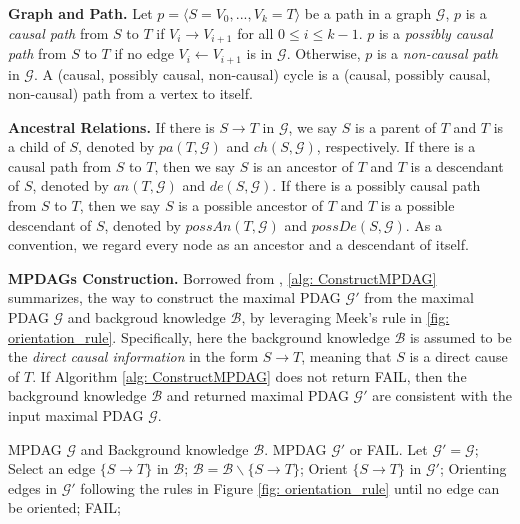 \documentclass{article}
\begin{document}
\textbf{Graph and Path.}
Let $p=\langle S=V_{0},..., V_{k}=T\rangle $ be a path in a graph $\mathcal{G}$, $p$ is a \textit{causal path} from $S$ to $T$ if $V_i \rightarrow V_{i+1}$ for all $0 \leq i \leq k-1 $. $p$ is a \textit{possibly causal path} from $S$ to $T$ if no edge $V_i \leftarrow V_{i+1}$ is in $\mathcal{G}$. Otherwise, $p$ is a \textit{non-causal path} in $\mathcal{G}$. A (causal, possibly causal, non-causal) cycle is a (causal, possibly causal, non-causal) path from a vertex to itself.

\textbf{Ancestral Relations.}
If there is $S \rightarrow T$ in $\mathcal{G}$, we say $S$ is a parent of $T$ and $T$ is a child of $S$, denoted by $pa(T,\mathcal{G})$ and $ch(S,\mathcal{G})$, respectively. If there is a causal path from $S$ to $T$, then we say $S$ is an ancestor of $T$ and $T$ is a descendant of $S$, denoted by $an(T,\mathcal{G})$ and $de(S,\mathcal{G})$. If there is a possibly causal path from $S$ to $T$, then we say $S$ is a possible ancestor of $T$ and $T$ is a possible descendant of $S$, denoted by $possAn(T,\mathcal{G})$ and $possDe(S,\mathcal{G})$. As a convention, we regard every node as an ancestor and a descendant of itself.

\textbf{MPDAGs Construction.} Borrowed from \citep{perkovic2017interpreting}, \cref{alg: ConstructMPDAG} summarizes, the way to construct the maximal PDAG $\mathcal{G'}$ from the maximal PDAG $\mathcal{G}$ and backgroud knowledge $\mathcal{B}$, by leveraging Meek's rule in \cref{fig: orientation_rule}. Specifically, here the background knowledge $\mathcal{B}$ is assumed to be the \textit{direct causal information} in the form $S \rightarrow T$, meaning that $S$ is a direct cause of $T$. If Algorithm \ref{alg: ConstructMPDAG} does not return FAIL, then the background knowledge $\mathcal{B}$ and returned maximal PDAG $\mathcal{G'}$ are consistent with the input maximal PDAG $\mathcal{G}$.

\begin{algorithm}
\caption{Construct MPDAG \citep{perkovic2017interpreting, meek1995causal}}
\label{alg: ConstructMPDAG}
\begin{algorithmic}[1]
 MPDAG $\mathcal{G}$ and Background knowledge $\mathcal{B}$.
 MPDAG $\mathcal{G'}$ or FAIL.
\State Let $\mathcal{G'}=\mathcal{G}$;
    \State Select an edge $\{S \rightarrow T\}$ in $\mathcal{B}$;
    \State $\mathcal{B} = \mathcal{B} \backslash \{S \rightarrow T\}$;
        \State Orient $\{S\rightarrow T\}$ in $\mathcal{G'}$;
        \State Orienting edges in $\mathcal{G'}$ following the rules in Figure \ref{fig: orientation_rule} until no edge can be oriented;
    \Else
        \State FAIL;
    \EndIf
\EndWhile
\end{algorithmic}
\end{algorithm}
\end{document}
